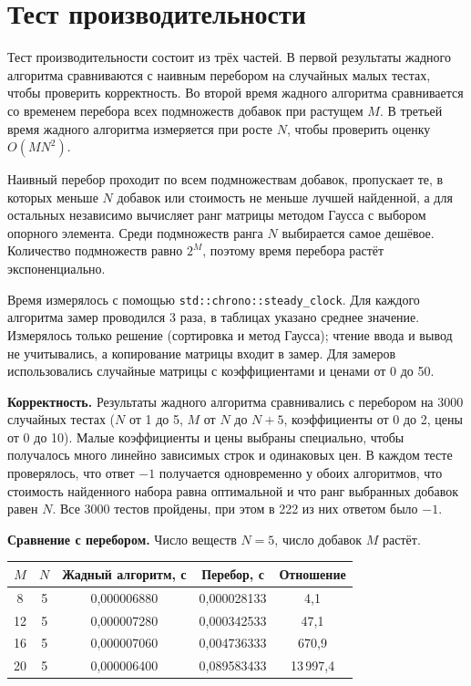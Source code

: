 \section{Тест производительности}
Тест производительности состоит из трёх частей. В первой результаты жадного алгоритма
сравниваются с наивным перебором на случайных малых тестах, чтобы проверить корректность.
Во второй время жадного алгоритма сравнивается со временем перебора всех подмножеств
добавок при растущем $M$. В третьей время жадного алгоритма измеряется при росте $N$,
чтобы проверить оценку $O(MN^2)$.

Наивный перебор проходит по всем подмножествам добавок, пропускает те, в которых меньше
$N$ добавок или стоимость не меньше лучшей найденной, а для остальных независимо вычисляет ранг
матрицы методом Гаусса с выбором опорного элемента. Среди подмножеств ранга $N$ выбирается
самое дешёвое. Количество подмножеств равно $2^M$, поэтому время перебора растёт экспоненциально.

Время измерялось с помощью \texttt{std::chrono::steady\_clock}. Для каждого алгоритма замер
проводился 3 раза, в таблицах указано среднее
значение. Измерялось только решение (сортировка и метод Гаусса); чтение ввода и вывод не
учитывались, а копирование матрицы входит в замер. Для замеров использовались случайные матрицы
с коэффициентами и ценами от 0 до 50.

\textbf{Корректность.} Результаты жадного алгоритма сравнивались с перебором на
3000 случайных тестах ($N$ от 1 до 5, $M$ от $N$ до $N + 5$, коэффициенты от 0 до 2, цены от 0 до 10).
Малые коэффициенты и цены выбраны специально, чтобы получалось много линейно зависимых строк и
одинаковых цен. В каждом тесте проверялось, что ответ $-1$ получается одновременно у обоих алгоритмов,
что стоимость найденного набора равна оптимальной и что ранг выбранных добавок равен $N$.
Все 3000 тестов пройдены, при этом в 222 из них ответом было $-1$.

\textbf{Сравнение с перебором.} Число веществ $N = 5$, число добавок $M$ растёт.

\begin{table}[h]
\centering
\begin{tabular}{|c|c|c|c|c|}
\hline
$M$ & $N$ & Жадный алгоритм, с & Перебор, с & Отношение \\
\hline
8  & 5 & 0{,}000006880 & 0{,}000028133 & 4{,}1 \\
12 & 5 & 0{,}000007280 & 0{,}000342533 & 47{,}1 \\
16 & 5 & 0{,}000007060 & 0{,}004736333 & 670{,}9 \\
20 & 5 & 0{,}000006400 & 0{,}089583433 & 13\,997{,}4 \\
\hline
\end{tabular}
\end{table}

